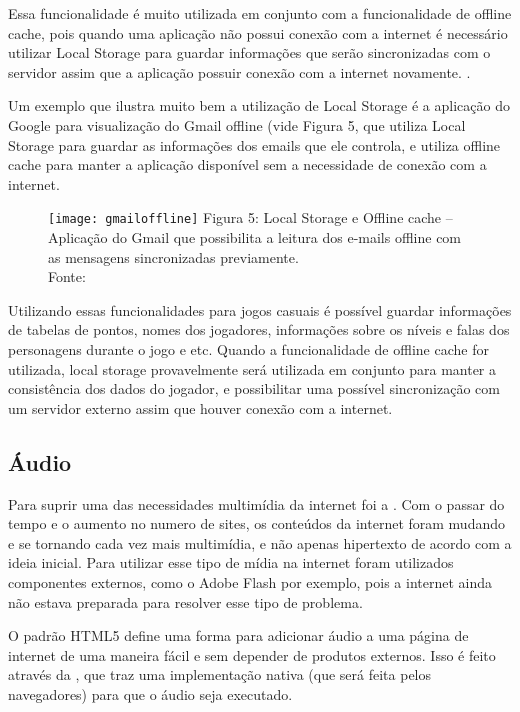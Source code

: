 Essa funcionalidade é muito utilizada em conjunto com a funcionalidade
de offline cache, pois quando uma aplicação não possui conexão com a
internet é necessário utilizar Local Storage para guardar informações
que serão sincronizadas com o servidor assim que a aplicação possuir
conexão com a internet novamente. \cite{pilgrim2010html5}.

Um exemplo que ilustra muito bem a utilização de Local Storage é a
aplicação do Google para visualização do Gmail offline (vide
Figura 5, que utiliza Local Storage para guardar
as informações dos emails que ele controla, e utiliza offline cache
para manter a aplicação disponível sem a necessidade de conexão com a
internet.

\begin{figure}[H]
  \centering
	\texttt{[image: gmailoffline]}
	\footnotesize\hspace{8\baselineskip}
	Figura 5: Local Storage e Offline cache {--} Aplicação do Gmail que possibilita a leitura dos e-mails offline com as mensagens sincronizadas previamente. \\
	Fonte: \cite{website:gmailoffline}
  \label{img:gmailoffline}
\end{figure}

Utilizando essas funcionalidades para jogos casuais é possível
guardar informações de tabelas de pontos, nomes dos jogadores,
informações sobre os níveis e falas dos personagens durante o jogo e
etc. Quando a funcionalidade de offline cache for utilizada, local
storage provavelmente será utilizada em conjunto para manter a
consistência dos dados do jogador, e possibilitar uma possível
sincronização com um servidor externo assim que houver conexão com a
internet.

\subsection{Áudio}
Para suprir uma das necessidades multimídia
da internet foi a \tagaudio. Com o passar do tempo e o aumento no
numero de sites, os conteúdos da internet foram mudando
e se tornando cada vez mais multimídia, e não apenas hipertexto de
acordo com a ideia inicial. Para utilizar esse tipo de mídia na
internet foram utilizados componentes externos, como o Adobe Flash por
exemplo, pois a internet ainda não estava preparada para resolver esse
tipo de problema.

O padrão HTML5 define uma forma para adicionar áudio a uma página de
internet de uma maneira fácil e sem depender de produtos externos.
Isso é feito através da \tagaudio, que traz uma
implementação nativa (que será feita pelos navegadores) para que o
áudio seja executado.


